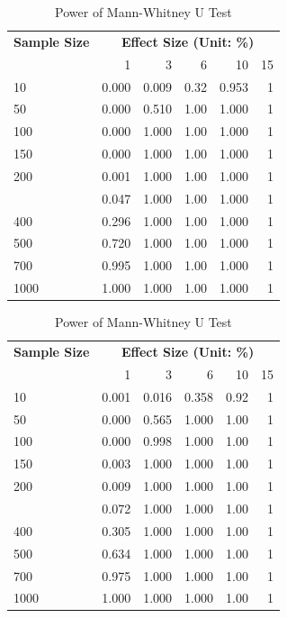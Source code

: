 \documentclass[]{article}
\begin{document}
\begin{table}[!htb]
    \begin{minipage}{.5\linewidth}
      \centering 
\begin{longtable}[t]{lrrrrr}
\caption{\label{tab:power-tables}Power of Student's T Test}\\
\toprule
\multicolumn{1}{c}{\bfseries Sample Size} & \multicolumn{5}{c}{\bfseries Effect Size (Unit: \%)} \\
\cmidrule(l{2pt}r{2pt}){1-1} \cmidrule(l{2pt}r{2pt}){2-6}
  & 1 & 3 & 6 & 10 & 15\\
\midrule
10 & 0.000 & 0.009 & 0.32 & 0.953 & 1\\
50 & 0.000 & 0.510 & 1.00 & 1.000 & 1\\
100 & 0.000 & 1.000 & 1.00 & 1.000 & 1\\
150 & 0.000 & 1.000 & 1.00 & 1.000 & 1\\
200 & 0.001 & 1.000 & 1.00 & 1.000 & 1\\
\addlinespace
300 & 0.047 & 1.000 & 1.00 & 1.000 & 1\\
400 & 0.296 & 1.000 & 1.00 & 1.000 & 1\\
500 & 0.720 & 1.000 & 1.00 & 1.000 & 1\\
700 & 0.995 & 1.000 & 1.00 & 1.000 & 1\\
1000 & 1.000 & 1.000 & 1.00 & 1.000 & 1\\
\bottomrule
\end{longtable} \end{minipage}%
    \begin{minipage}{.5\linewidth}
      \centering 
\begin{longtable}[t]{lrrrrr}
\caption{\label{tab:power-tables}Power of Mann-Whitney U Test}\\
\toprule
\multicolumn{1}{c}{\bfseries Sample Size} & \multicolumn{5}{c}{\bfseries Effect Size (Unit: \%)} \\
\cmidrule(l{2pt}r{2pt}){1-1} \cmidrule(l{2pt}r{2pt}){2-6}
  & 1 & 3 & 6 & 10 & 15\\
\midrule
10 & 0.001 & 0.016 & 0.358 & 0.92 & 1\\
50 & 0.000 & 0.565 & 1.000 & 1.00 & 1\\
100 & 0.000 & 0.998 & 1.000 & 1.00 & 1\\
150 & 0.003 & 1.000 & 1.000 & 1.00 & 1\\
200 & 0.009 & 1.000 & 1.000 & 1.00 & 1\\
\addlinespace
300 & 0.072 & 1.000 & 1.000 & 1.00 & 1\\
400 & 0.305 & 1.000 & 1.000 & 1.00 & 1\\
500 & 0.634 & 1.000 & 1.000 & 1.00 & 1\\
700 & 0.975 & 1.000 & 1.000 & 1.00 & 1\\
1000 & 1.000 & 1.000 & 1.000 & 1.00 & 1\\
\bottomrule
\end{longtable} \end{minipage} 
\end{table}
\end{document}
